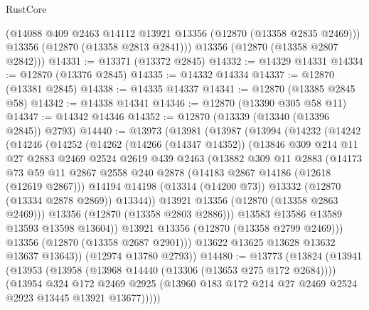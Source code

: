 \begin{lexlean}{RustCore}
\begin{coremodule}
        (@14088 @409 @2463 @14112 @13921 @13356 (@12870 (@13358 @2835 @2469)))
        @13356
        (@12870 (@13358 @2813 @2841)))
      @13356
      (@12870 (@13358 @2807 @2842)))
@14331 := @13371 (@13372 @2845)
@14332 := @14329 @14331
@14334 := @12870 (@13376 @2845)
@14335 := @14332 @14334
@14337 := @12870 (@13381 @2845)
@14338 := @14335 @14337
@14341 := @12870 (@13385 @2845 @58)
@14342 := @14338 @14341
@14346 := @12870 (@13390 @305 @58 @11)
@14347 := @14342 @14346
@14352 := @12870 (@13339 (@13340 (@13396 @2845)) @2793)
@14440 := @13973
    (@13981
      (@13987
        (@13994
          (@14232
            (@14242
              (@14246
                (@14252
                  (@14262
                    (@14266 (@14347 @14352))
                    (@13846
                      @309
                      @214
                      @11
                      @27
                      @2883
                      @2469
                      @2524
                      @2619
                      @439
                      @2463
                      (@13882
                        @309
                        @11
                        @2883
                        (@14173
                          @73
                          @59
                          @11
                          @2867
                          @2558
                          @240
                          @2878
                          (@14183 @2867 @14186 (@12618 (@12619 @2867)))
                          @14194
                          @14198
                          (@13314 (@14200 @73))
                          @13332
                          (@12870 (@13334 @2878 @2869))
                          @13344))
                      @13921
                      @13356
                      (@12870 (@13358 @2863 @2469)))
                    @13356
                    (@12870 (@13358 @2803 @2886)))
                  @13583
                  @13586
                  @13589
                  @13593
                  @13598
                  @13604))
              @13921
              @13356
              (@12870 (@13358 @2799 @2469)))
            @13356
            (@12870 (@13358 @2687 @2901)))
          @13622
          @13625
          @13628
          @13632
          @13637
          @13643))
      (@12974 @13780 @2793))
@14480 := @13773
    (@13824
      (@13941
        (@13953
          (@13958 (@13968 @14440 (@13306 (@13653 @275 @172 @2684))))
          (@13954
            @324
            @172
            @2469
            @2925
            (@13960 @183 @172 @214 @27 @2469 @2524 @2923 @13445 @13921 @13677)))))

\end{coremodule}
\end{lexlean}
